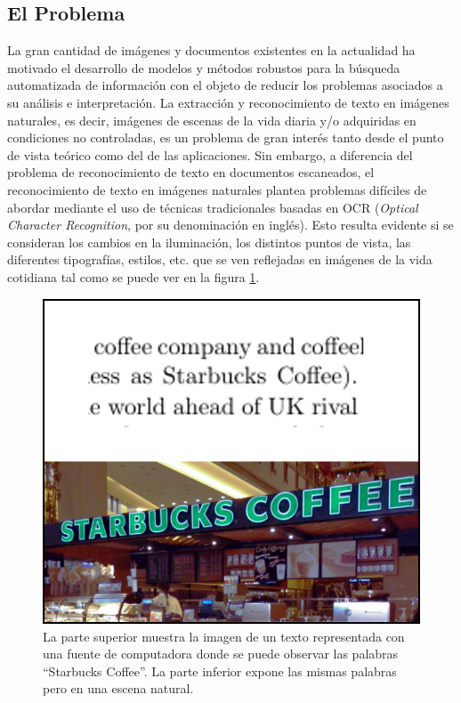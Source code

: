 \subsection{El Problema}

	La gran cantidad de imágenes y documentos existentes en la actualidad ha motivado el desarrollo de modelos y métodos robustos para la búsqueda automatizada de información con el objeto de reducir los problemas asociados a su análisis e interpretación. La extracción y reconocimiento de texto en imágenes naturales, es decir, imágenes de escenas de la vida diaria y/o adquiridas en condiciones no controladas, es un problema de gran interés tanto desde el punto de vista teórico como del de las aplicaciones.  Sin embargo, a diferencia del problema de reconocimiento de texto en documentos escaneados, el reconocimiento de texto en imágenes naturales plantea problemas difíciles de abordar mediante el uso de técnicas tradicionales basadas en OCR (\textit{Optical Character Recognition}, por su denominación en inglés). Esto resulta evidente si se consideran los cambios en la iluminación, los distintos puntos de vista, las diferentes tipografías, estilos, etc. que se ven reflejadas en imágenes de la vida cotidiana tal como se puede ver en la figura \ref{fig: Optophone}.
	
			\begin{figure}[htbp]
				\centering
				\centerline{
					\includegraphics[scale=0.31]{img/ocr_vs_naturalImg_3.jpg}
				}
				\caption[OCRvsNaturales]{La parte superior muestra la imagen de un texto representada con una fuente de computadora donde se puede observar las palabras ``Starbucks Coffee''. La parte inferior expone las mismas palabras pero en una escena natural.}
				\label{fig: Optophone}
			\end{figure}
			
